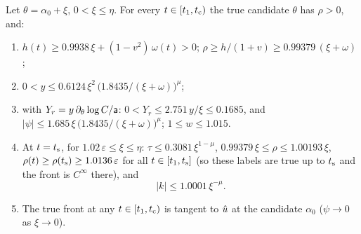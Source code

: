 \begin{lemma}\label{lem:T1-fwd}
Let $\theta=\alpha_0+\xi$, $0<\xi\le\eta$. For every $t\in[t_1,t_{\mathrm c})$ the true candidate $\theta$ has $\rho>0$, and:
\begin{enumerate}
\item[(a)] $h(t)\ge0.9938\,\xi+(1-v^2)\,\omega(t)>0$; $\rho\ge h/(1+v)\ge0.99379\,(\xi+\omega)$;
\item[(b)] $0<y\le0.6124\,\xi^2\,\bigl(1.8435/(\xi+\omega)\bigr)^\mu$;
\item[(c)] with $Y_r=y\,\partial_\theta\log C/\mathsf a$: $0<Y_r\le2.751\,y/\xi\le0.1685$, and
$|\psi|\le1.685\,\xi\,\bigl(1.8435/(\xi+\omega)\bigr)^\mu$; $1\le w\le1.015$.
\item[(d)] At $t=t_{\mathrm s}$, for $1.02\,\varepsilon\le\xi\le\eta$: $\tau\le0.3081\,\xi^{1-\mu}$, $0.99379\,\xi\le\rho\le1.00193\,\xi$,
$\rho(t)\ge\rho(t_{\mathrm s})\ge1.0136\,\varepsilon$ for all $t\in[t_1,t_{\mathrm s}]$ (so these labels are true up to $t_{\mathrm s}$ and the front is
$C^\infty$ there), and
\[
|k|\le1.0001\,\xi^{-\mu}.
\]
\item[(e)] The true front at any $t\in[t_1,t_{\mathrm c})$ is tangent to $\hat u$ at the candidate $\alpha_0$ ($\psi\to0$ as $\xi\to0$).
\end{enumerate}
\end{lemma}
